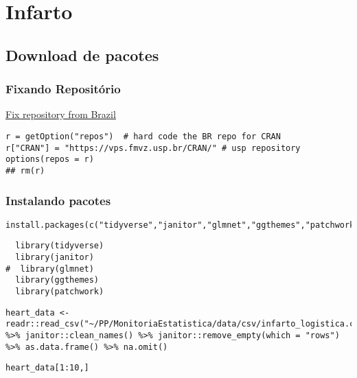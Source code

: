\documentclass[11pt]{article}
\date{\today}
\title{}
\begin{document}
\tableofcontents


\section{Infarto}
\label{sec:org8b1d153}
\subsection{Download de pacotes}
\label{sec:org84177f4}
\subsubsection{Fixando Repositório}
\label{sec:org55f917c}
\href{https://stackoverflow.com/questions/1189759/expert-r-users-whats-in-your-rprofile/1189826\#1189826}{Fix repository from Brazil}
\begin{verbatim}
r = getOption("repos")  # hard code the BR repo for CRAN
r["CRAN"] = "https://vps.fmvz.usp.br/CRAN/" # usp repository
options(repos = r)
## rm(r)
\end{verbatim}

\subsubsection{Instalando pacotes}
\label{sec:orgaced5fe}

\begin{verbatim}
install.packages(c("tidyverse","janitor","glmnet","ggthemes","patchwork"))
\end{verbatim}


\begin{verbatim}
  library(tidyverse)
  library(janitor)
#  library(glmnet)
  library(ggthemes)
  library(patchwork)
\end{verbatim}

\begin{verbatim}
heart_data <- readr::read_csv("~/PP/MonitoriaEstatistica/data/csv/infarto_logistica.csv") %>% janitor::clean_names() %>% janitor::remove_empty(which = "rows") %>% as.data.frame() %>% na.omit()
\end{verbatim}

\begin{verbatim}
heart_data[1:10,]
\end{verbatim}
\end{document}
